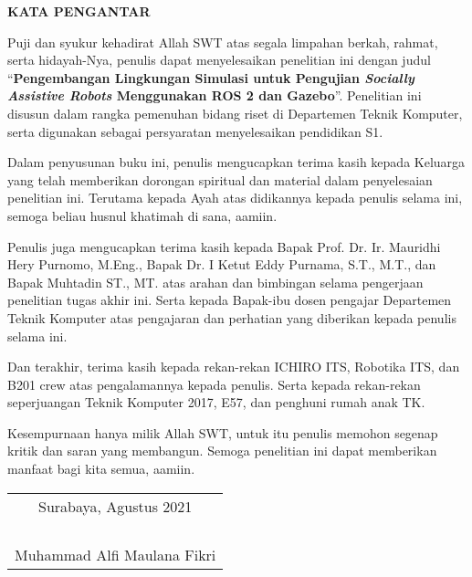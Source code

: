 \begin{center}
  \Large
  \textbf{KATA PENGANTAR}
\end{center}

\vspace{2ex}

Puji dan syukur kehadirat Allah SWT atas segala limpahan berkah, rahmat, serta hidayah-Nya, penulis  dapat menyelesaikan penelitian ini dengan judul
``\textbf{Pengembangan Lingkungan Simulasi untuk Pengujian \emph{Socially Assistive Robots} Menggunakan ROS 2 dan Gazebo}''.
Penelitian ini disusun dalam rangka pemenuhan bidang riset di Departemen Teknik Komputer,
  serta digunakan sebagai persyaratan menyelesaikan pendidikan S1.

Dalam penyusunan buku ini,
  penulis mengucapkan terima kasih kepada Keluarga yang telah memberikan dorongan spiritual dan material dalam penyelesaian penelitian ini.
Terutama kepada Ayah atas didikannya kepada penulis selama ini,
  semoga beliau husnul khatimah di sana, aamiin.

Penulis juga mengucapkan terima kasih kepada Bapak Prof. Dr. Ir. Mauridhi Hery Purnomo, M.Eng.,
  Bapak Dr. I Ketut Eddy Purnama, S.T., M.T.,
  dan Bapak Muhtadin ST., MT. atas arahan dan bimbingan selama pengerjaan penelitian tugas akhir ini.
Serta kepada Bapak-ibu dosen pengajar Departemen Teknik Komputer atas pengajaran dan perhatian yang diberikan kepada penulis selama ini.

Dan terakhir,
  terima kasih kepada rekan-rekan ICHIRO ITS, Robotika ITS, dan B201 crew atas pengalamannya kepada penulis.
Serta kepada rekan-rekan seperjuangan Teknik Komputer 2017, E57, dan penghuni rumah anak TK.

Kesempurnaan hanya milik Allah SWT, untuk itu penulis memohon segenap kritik dan saran yang  membangun.
Semoga penelitian ini dapat memberikan manfaat bagi kita semua, aamiin.

\vspace{4ex}

\begin{flushright}
  \begin{tabular}[b]{c}
    Surabaya, Agustus 2021\\
    \\
    \\
    \\
    \\
    Muhammad Alfi Maulana Fikri
  \end{tabular}
\end{flushright}
